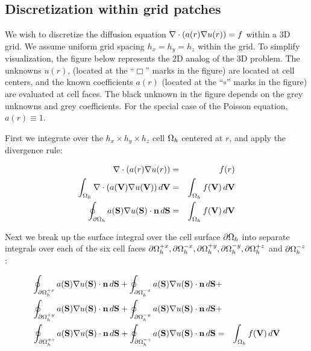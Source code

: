 \documentclass[10pt]{article}
\begin{document}
\subsection{Discretization within grid patches} \label{ss:discret-unigrid}

We wish to discretize the diffusion equation $\nabla\cdot(a(r) \nabla
u(r)) = f$ within a $3$D grid.  We assume uniform
grid spacing $h_{x} = h_{y} = h_{z}$ within the grid.  To simplify
visualization, the figure below represents the $2$D analog of the $3$D
problem.  The unknowns $u(r)$, (located at the ``$\Box$'' marks in the
figure) are located at cell centers, and the known coefficients $a(r)$
(located at the ``$\circ$'' marks in the figure) are evaluated at cell
faces.  The black unknown in the figure depends on the grey unknowns
and grey coefficients.  For the special case of the Poisson equation,
$a(r)\equiv 1$.

\begin{center}
\begin{minipage}{1.5in}
\end{minipage} 
\end{center}

First we integrate over the $h_x \times h_y \times h_z$ cell ${\Omega_h}$
centered at $r$, and apply the divergence rule:

 \begin{eqnarray*}
 \nabla\cdot(a(r) \nabla u(r)) & = & f(r) \\
 \int_{\Omega_h} \nabla\cdot(a(\textbf{V}) \nabla u(\textbf{V}))\, d\textbf{V} & = & \int_{\Omega_h} f(\textbf{V})\, d\textbf{V} \\
 \oint_{\partial{\Omega_h}} a(\textbf{S}) \nabla u(\textbf{S})\cdot \textbf{n} \, d\textbf{S} & = & \int_{\Omega_h} f(\textbf{V})\, d\textbf{V}
 \end{eqnarray*}

Next we break up the surface integral over the cell surface $\partial{\Omega_h}$
into separate integrals over each of the six cell faces
$\partial\Omega_h^{+x},\partial\Omega_h^{-x},\partial\Omega_h^{+y},\partial\Omega_h^{-y},\partial\Omega_h^{+z}$ and $\partial\Omega_h^{-z}$:

 \begin{eqnarray*}
 \oint_{\partial\Omega_h^{+x}} a(\textbf{S}) \nabla u(\textbf{S})\cdot \textbf{n} \, d\textbf{S} +  \oint_{\partial\Omega_h^{-x}} a(\textbf{S}) \nabla u(\textbf{S})\cdot \textbf{n} \, d\textbf{S} & + & \\
 \oint_{\partial\Omega_h^{+y}} a(\textbf{S}) \nabla u(\textbf{S})\cdot \textbf{n} \, d\textbf{S} +  \oint_{\partial\Omega_h^{-y}} a(\textbf{S}) \nabla u(\textbf{S})\cdot \textbf{n} \, d\textbf{S} & + & \\
 \oint_{\partial\Omega_h^{+z}} a(\textbf{S}) \nabla u(\textbf{S})\cdot \textbf{n} \, d\textbf{S} +  \oint_{\partial\Omega_h^{-z}} a(\textbf{S}) \nabla u(\textbf{S})\cdot \textbf{n} \, d\textbf{S} & = & \int_{\Omega_h} f(\textbf{V})\, d\textbf{V}
 \end{eqnarray*}
\end{document}
